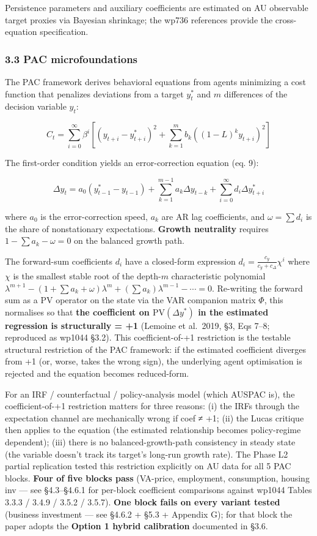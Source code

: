 \documentclass[
]{article}
\begin{document}
Persistence parameters and auxiliary coefficients are estimated on AU
observable target proxies via Bayesian shrinkage; the wp736 references
provide the cross-equation specification.

\subsubsection{3.3 PAC microfoundations}\label{pac-microfoundations}

The PAC framework derives behavioral equations from agents minimizing a
cost function that penalizes deviations from a target \(y^*_t\) and
\(m\) differences of the decision variable \(y_t\):

\[C_t = \sum_{i=0}^{\infty} \beta^i \left[(y_{t+i} - y^*_{t+i})^2 + \sum_{k=1}^{m} b_k ((1-L)^k y_{t+i})^2\right]\]

The first-order condition yields an error-correction equation (eq. 9):

\[\Delta y_t = a_0 (y^*_{t-1} - y_{t-1}) + \sum_{k=1}^{m-1} a_k \Delta y_{t-k} + \sum_{i=0}^{\infty} d_i \Delta y^*_{t+i}\]

where \(a_0\) is the error-correction speed, \(a_k\) are AR lag
coefficients, and \(\omega = \sum d_i\) is the share of nonstationary
expectations. \textbf{Growth neutrality} requires
\(1 - \sum a_k - \omega = 0\) on the balanced growth path.

The forward-sum coefficients \(d_i\) have a closed-form expression
\(d_i = \frac{c_y}{c_y + c_\Delta}\chi^i\) where \(\chi\) is the
smallest stable root of the depth-\(m\) characteristic polynomial
\(\lambda^{m+1} - (1 + \sum a_k + \omega)\lambda^m + (\sum a_k)\lambda^{m-1} - \cdots = 0\).
Re-writing the forward sum as a PV operator on the state via the VAR
companion matrix \(\Phi\), this normalises so that \textbf{the
coefficient on \(\mathrm{PV}(\Delta y^*)\) in the estimated regression
is structurally = +1} (Lemoine et al.~2019, §3, Eqs 7--8; reproduced as
wp1044 §3.2). This coefficient-of-+1 restriction is the testable
structural restriction of the PAC framework: if the estimated
coefficient diverges from +1 (or, worse, takes the wrong sign), the
underlying agent optimisation is rejected and the equation becomes
reduced-form.

For an IRF / counterfactual / policy-analysis model (which AUSPAC is),
the coefficient-of-+1 restriction matters for three reasons: (i) the
IRFs through the expectation channel are mechanically wrong if coef ≠
+1; (ii) the Lucas critique then applies to the equation (the estimated
relationship becomes policy-regime dependent); (iii) there is no
balanced-growth-path consistency in steady state (the variable doesn't
track its target's long-run growth rate). The Phase L2 partial
replication tested this restriction explicitly on AU data for all 5 PAC
blocks. \textbf{Four of five blocks pass} (VA-price, employment,
consumption, housing inv --- see §4.3--§4.6.1 for per-block coefficient
comparisons against wp1044 Tables 3.3.3 / 3.4.9 / 3.5.2 / 3.5.7).
\textbf{One block fails on every variant tested} (business investment
--- see §4.6.2 + §5.3 + Appendix G); for that block the paper adopts the
\textbf{Option 1 hybrid calibration} documented in §3.6.
\end{document}
